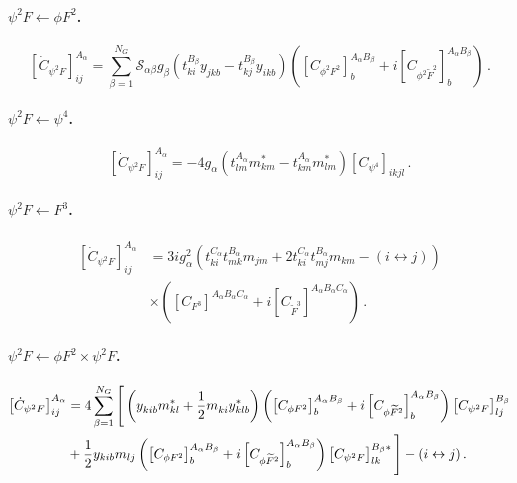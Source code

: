 \paragraph{$\psi^2  F \leftarrow \phi F^2$.}

\begin{equation}
    \left[\dot C_{\psi^2  F}\right]_{ij}^{A_\alpha} =
    \sum_{\beta=1}^{N_G} \mathcal S_{\alpha\beta} g_\beta \left(t^{B_\beta}_{ki} y_{jkb}-t^{B_\beta}_{kj} y_{ikb}  \right) \left(
    \left[C_{\phi^2 F^2}\right]_{b}^{A_\alpha B_\beta} + i \left[C_{\phi^2 \widetilde F^2}\right]_{b}^{A_\alpha B_\beta}
    \right)\,.\label{psi2F_phiF2}
\end{equation}

\paragraph{$\psi^2 F \leftarrow \psi^4$.}

\begin{equation}
    \left[\dot C_{\psi^2 F}\right]_{ij}^{A_\alpha} = - 4 g_\alpha \left(
    t^{A_\alpha}_{lm} m^*_{km} - t^{A_\alpha}_{km} m^*_{lm} 
    \right)
    \left[C_{\psi^4}\right]_{ikjl}
    \,.\label{psi2F_psi4}
\end{equation}

\paragraph{$\psi^2 F \leftarrow F^3$.}

\begin{align}
    \left[\dot C_{\psi^2  F}\right]_{ij}^{A_\alpha} &=  3ig_\alpha^2 \left(t^{C_\alpha}_{ki}t^{B_\alpha}_{mk}m_{jm} + 2 t^{C_\alpha}_{ki} t^{B_\alpha}_{mj}m_{km}
    - \left(i \leftrightarrow j \right)
    \right)\nonumber
    \\&\times 
    \left(
    \left[C_{F^3}\right]^{A_\alpha B_\alpha C_\alpha}+i \left[C_{\widetilde F^3}\right]^{A_\alpha B_\alpha C_\alpha}
    \right)\,.
    \label{psi2F_F3}
\end{align}

\paragraph{$\psi^2 F \leftarrow \phi F^2 \times \psi^2 F$.}

\begin{align}
    \left[\dot C_{\psi^2  F}\right]_{ij}^{A_\alpha} & =
    4 \sum_{\beta=1}^{N_G}\Bigg[ \left(y_{kib}^{\phantom *}m_{kl}^* + \frac{1}{2}m_{ki}^{\phantom *}y_{klb}^*\right)\left(\left[C_{\phi F^2}\right]_{b}^{A_\alpha B_\beta}+i\left[C_{\phi \tildee F^2}\right]_{b}^{A_\alpha B_\beta}\right)\left[C_{\psi^2 F}\right]_{lj}^{B_\beta}\nonumber\\
    &+ \frac{1}{2}y_{kib} m_{lj}\left(\left[C_{\phi F^2}\right]_{b}^{A_\alpha B_\beta}+i\left[C_{\phi \tildee F^2}\right]_{b}^{A_\alpha B_\beta}\right)\left[C_{\psi^2 F}\right]_{lk}^{B_\beta*}\Bigg] - (i\leftrightarrow j)
    \,.
\end{align}

